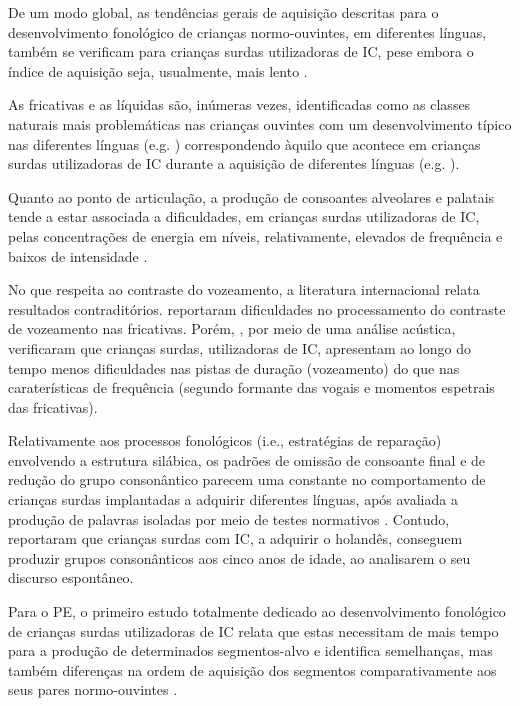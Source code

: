 \documentclass[output=paper,colorlinks,citecolor=brown,booklanguage=portuguese]{langscibook}
\begin{document}
De um modo global, as tendências gerais de aquisição descritas para o desenvolvimento fonológico de crianças normo-ouvintes, em diferentes línguas, também se verificam para crianças surdas utilizadoras de IC, pese embora o índice de aquisição seja, usualmente, mais lento \citep{Serry1999, Lynce2019}. 

As fricativas e as líquidas são, inúmeras vezes, identificadas como as classes naturais mais problemáticas nas crianças ouvintes com um desenvolvimento típico nas diferentes línguas (e.g. \citealp{Bernhardt1998, Demuth2014, Johnson2010}) correspondendo àquilo que acontece em crianças surdas utilizadoras de IC durante a aquisição de diferentes línguas (e.g. \citealp{Chin2000, Spencer2013, WarnerCzyz2008}).

Quanto ao ponto de articulação, a produção de consoantes alveolares e palatais tende a estar associada a dificuldades, em crianças surdas utilizadoras de IC, pelas concentrações de energia em níveis, relativamente, elevados de frequência e baixos de intensidade \citep{Blamey2001}.

No que respeita ao contraste do vozeamento, a literatura internacional relata resultados contraditórios. \citet{Flipsen2008} reportaram dificuldades no processamento do contraste de vozeamento nas fricativas. Porém, \citet{Grandon2017}, por meio de uma análise acústica, verificaram que crianças surdas, utilizadoras de IC, apresentam ao longo do tempo menos dificuldades nas pistas de duração (vozeamento) do que nas caraterísticas de frequência (segundo formante das vogais e momentos espetrais das fricativas).

Relativamente aos processos fonológicos (i.e., estratégias de reparação) envolvendo a estrutura silábica, os padrões de omissão de consoante final e de redução do grupo consonântico parecem uma constante no comportamento de crianças surdas implantadas a adquirir diferentes línguas, após avaliada a produção de palavras isoladas por meio de testes normativos \citep{Doble2006, Flipsen2008, Grogan1995}. Contudo, \citet{Faes2017} reportaram que crianças surdas com IC, a adquirir o holandês, conseguem produzir grupos consonânticos aos cinco anos de idade, ao analisarem o seu discurso espontâneo.

Para o PE, o primeiro estudo totalmente dedicado ao desenvolvimento fonológico de crianças surdas utilizadoras de IC relata que estas necessitam de mais tempo para a produção de determinados segmentos-alvo e identifica semelhanças, mas também diferenças na ordem de aquisição dos segmentos comparativamente aos seus pares normo-ouvintes \citep{Lynce2019}. 
\end{document}
